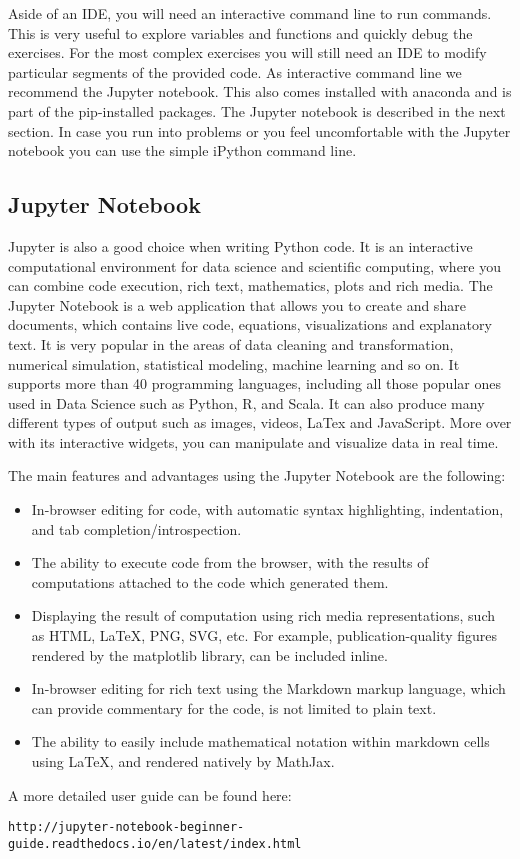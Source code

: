 Aside of an IDE, you will need an interactive command line to run commands. This is very useful to explore variables and functions and quickly debug the exercises. For the most complex exercises you will still need an IDE to modify particular segments of the provided code. As interactive command line we recommend the Jupyter notebook. This also comes installed with anaconda and is part of the pip-installed packages. The Jupyter notebook is described in the next section. In case you run into problems or you feel uncomfortable with the Jupyter notebook you can use the simple iPython command line.

\subsection{Jupyter Notebook}

Jupyter is also a good choice when writing Python code. It is an interactive computational environment for data science and scientific computing, where you can combine code execution, rich text, mathematics, plots and rich media. The Jupyter Notebook is a web application that allows you to create and share documents, which contains live code, equations, visualizations and explanatory text. It is very popular in the areas of data cleaning and transformation, numerical simulation, statistical modeling, machine learning and so on. It supports more than 40 programming languages, including all those popular ones used in Data Science such as Python, R, and Scala. It can also produce many different types of output such as images, videos, LaTex and JavaScript. More over with its interactive widgets, you can manipulate and visualize data in real time.

\noindent The main features and advantages using the Jupyter Notebook are the
following:

\begin{itemize}

\item In-browser editing for code, with automatic syntax highlighting, indentation, and tab completion/introspection.

\item The ability to execute code from the browser, with the results of computations attached to the code which generated them.

\item Displaying the result of computation using rich media representations, such as HTML, LaTeX, PNG, SVG, etc. For example, publication-quality figures rendered by the matplotlib library, can be included inline.

\item In-browser editing for rich text using the Markdown markup language, which can provide commentary for the code, is not limited to plain text.

\item The ability to easily include mathematical notation within markdown cells using LaTeX, and rendered natively by MathJax.

\end{itemize}

\noindent A more detailed user guide can be found here:

\begin{verbatim}
http://jupyter-notebook-beginner-guide.readthedocs.io/en/latest/index.html
\end{verbatim}
